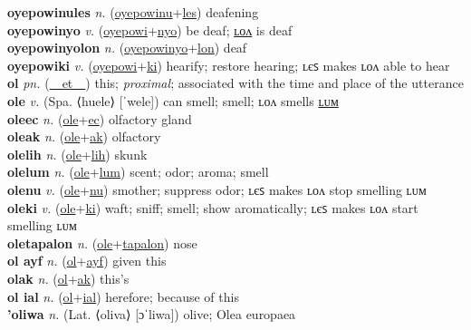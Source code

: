 \textbf{oyepowinules} \textit{n.} (\hyperref[oyepowinu]{oyepowinu}+\hyperref[les]{les})
deafening \label{oyepowinules} \\
\textbf{oyepowinyo} \textit{v.} (\hyperref[oyepowi]{oyepowi}+\hyperref[nyo]{nyo})
be deaf; \hyperref[oyepowinyolon]{ʟᴏᴧ} is deaf \label{oyepowinyo} \\
\textbf{oyepowinyolon} \textit{n.} (\hyperref[oyepowinyo]{oyepowinyo}+\hyperref[lon]{lon})
deaf \label{oyepowinyolon} \\
\textbf{oyepowiki} \textit{v.} (\hyperref[oyepowi]{oyepowi}+\hyperref[ki]{ki})
hearify; restore hearing; ʟєꜱ makes ʟᴏᴧ able to hear \label{oyepowiki} \\
\textbf{ol} \textit{pn.} (\hyperref[et]{~~et~~})
this; \textit{proximal}; associated with the time and place of the utterance \label{ol} \\
\textbf{ole} \textit{v.} (Spa. ⟨huele⟩ [ˈwele])
can smell; smell; ʟᴏᴧ smells \hyperref[olelum]{ʟᴜᴍ} \label{ole} \\
\textbf{oleec} \textit{n.} (\hyperref[ole]{ole}+\hyperref[ec]{ec})
olfactory gland \label{oleec} \\
\textbf{oleak} \textit{n.} (\hyperref[ole]{ole}+\hyperref[ak]{ak})
olfactory \label{oleak} \\
\textbf{olelih} \textit{n.} (\hyperref[ole]{ole}+\hyperref[lih]{lih})
skunk \label{olelih} \\
\textbf{olelum} \textit{n.} (\hyperref[ole]{ole}+\hyperref[lum]{lum})
scent; odor; aroma; smell \label{olelum} \\
\textbf{olenu} \textit{v.} (\hyperref[ole]{ole}+\hyperref[nu]{nu})
smother; suppress odor; ʟєꜱ makes ʟᴏᴧ stop smelling ʟᴜᴍ \label{olenu} \\
\textbf{oleki} \textit{v.} (\hyperref[ole]{ole}+\hyperref[ki]{ki})
waft; sniff; smell; show aromatically; ʟєꜱ makes ʟᴏᴧ start smelling ʟᴜᴍ \label{oleki} \\
\textbf{oletapalon} \textit{n.} (\hyperref[ole]{ole}+\hyperref[tapalon]{tapalon})
nose \label{oletapalon} \\
\textbf{ol ayf} \textit{n.} (\hyperref[ol]{ol}+\hyperref[yf]{ayf})
given this \label{ol ayf} \\
\textbf{olak} \textit{n.} (\hyperref[ol]{ol}+\hyperref[ak]{ak})
this’s \label{olak} \\
\textbf{ol ial} \textit{n.} (\hyperref[ol]{ol}+\hyperref[al]{ial})
herefore; because of this \label{ol ial} \\
\textbf{'oliwa} \textit{n.} (Lat. ⟨oliva⟩ [ɔˈliwa])
olive; Olea europaea \label{'oliwa} \\

